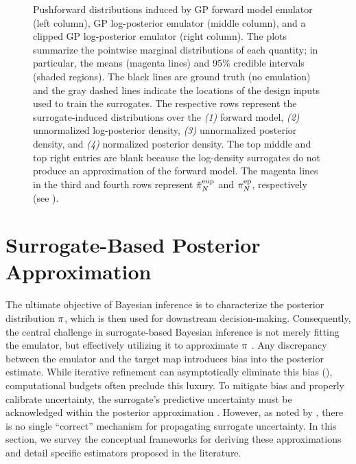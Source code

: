 \documentclass[12pt]{article}
\begin{document}
\begin{figure}[t]
    \ContinuedFloat
    \caption{Pushforward distributions induced by GP forward model emulator (left column), 
    GP log-posterior emulator (middle column), and a clipped GP log-posterior emulator (right column). 
    The plots summarize the pointwise marginal distributions of each quantity; in particular, the means (magenta lines)
    and 95\% credible intervals (shaded regions). The black lines are ground truth (no emulation) and the gray dashed lines 
    indicate the locations of the design inputs used to train the surrogates. The respective rows represent the surrogate-induced 
    distributions over the \emph{(1)} forward model, \emph{(2)} unnormalized log-posterior density, \emph{(3)} unnormalized 
    posterior density, and \emph{(4)} normalized posterior density. The top middle and top right entries are blank because the 
    log-density surrogates do not produce an approximation of the forward model. The magenta lines in the third and fourth 
    rows represent \texorpdfstring{${\tilde{\pi}}_{N}^{\mathrm{eup}}$}{the unnormalized EUP} and \texorpdfstring{${\pi}_{N}^{\mathrm{ep}}$}{the EP}, 
    respectively (see ).}
    \label{fig:em_dist_1d}
\end{figure}


\section{Surrogate-Based Posterior Approximation} \label{sec:post-approx}
The ultimate objective of Bayesian inference is to characterize the posterior distribution 
$\pi$, which is then used for downstream decision-making. Consequently, the 
central challenge in surrogate-based Bayesian inference is not merely fitting the emulator, but 
effectively utilizing it to approximate $\pi$ \citep{StuartTeck1,SinsbeckNowak}. 
Any discrepancy between the emulator and the target map introduces bias into the posterior estimate. 
While iterative refinement can asymptotically eliminate this bias (), 
computational budgets often preclude this luxury. To mitigate bias and properly calibrate uncertainty, 
the surrogate's predictive uncertainty must be acknowledged within the posterior approximation
\citep{BilionisBayesSurrogates,ourSurrPropPaper}. However, as noted by \citet{BurknerSurrogate}, 
there is no single ``correct'' mechanism for propagating 
surrogate uncertainty. In this section, we survey the conceptual frameworks for deriving these 
approximations and detail specific estimators proposed in the literature.
\end{document}
